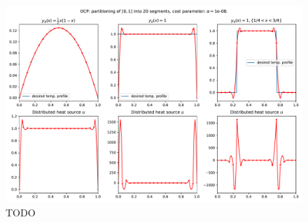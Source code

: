 \begin{figure}[!h]
  \centering
  \includegraphics[width=\textwidth]{Images/plots/task2_fig_2.pdf}
  \caption{TODO}
  \label{fig:2}
\end{figure}



